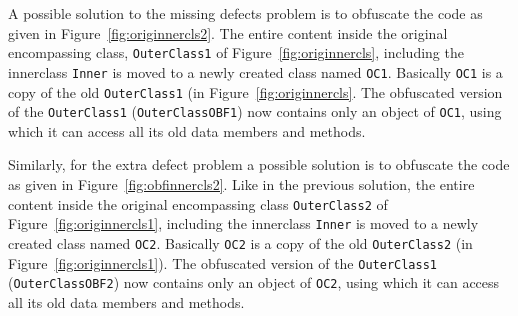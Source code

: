 \documentclass[twocolumn]{article}
\begin{document}
% 	
%   
%   
%  
%  
%      

A possible solution to the missing defects problem is to obfuscate the code as given in Figure~\ref{fig:originnercls2}. 
The entire content inside the original encompassing class, {\tt OuterClass1} of Figure~\ref{fig:originnercls}, including the innerclass {\tt Inner} is moved to a newly 
created class named {\tt OC1}. Basically {\tt OC1} is a copy of the old {\tt OuterClass1} (in Figure~\ref{fig:originnercls}. 
The obfuscated version of the {\tt OuterClass1} ({\tt OuterClassOBF1}) now contains only an object of {\tt OC1}, using which it can 
access all its old data members and methods. 

Similarly, for the extra defect problem a possible solution is to obfuscate the code as given in Figure~\ref{fig:obfinnercls2}. 
Like in the previous solution, the entire content inside the original encompassing class {\tt OuterClass2} of Figure~\ref{fig:originnercls1}, 
including the innerclass {\tt Inner} is moved to a newly created class named {\tt OC2}. Basically {\tt OC2} is a copy of the old {\tt OuterClass2} 
(in Figure~\ref{fig:originnercls1}). The obfuscated version of the {\tt OuterClass1} ({\tt OuterClassOBF2}) now contains only an object of {\tt OC2}, 
using which it can access all its old data members and methods. 
\end{document}
